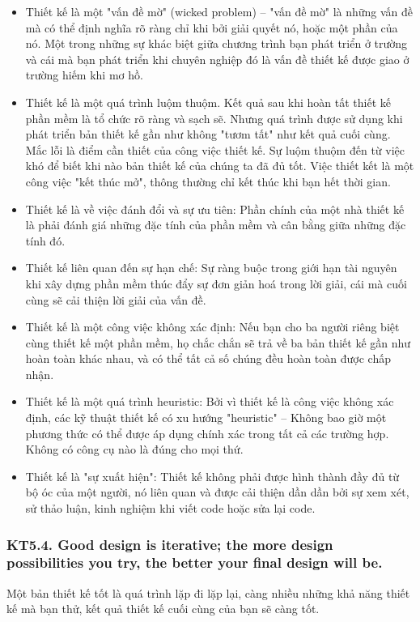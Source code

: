 \documentclass[12pt]{report}
\begin{document}
\begin{itemize}
	\item Thiết kế là một "vấn đề mờ" (wicked problem) -- "vấn đề mờ" là những vấn đề mà có thể định nghĩa rõ ràng chỉ khi bởi giải quyết nó, hoặc một phần của nó. Một trong những sự khác biệt giữa chương trình bạn phát triển ở trường và cái mà bạn phát triển khi chuyên nghiệp đó là vấn đề thiết kế được giao ở trường hiếm khi mơ hồ. 
	\item Thiết kế là một quá trình luộm thuộm. Kết quả sau khi hoàn tất thiết kế phần mềm là tổ chức rõ ràng và sạch sẽ. Nhưng quá trình được sử dụng khi phát triển bản thiết kế gần như không "tươm tất" như kết quả cuối cùng. Mắc lỗi là điểm cần thiết của công việc thiết kế. Sự luộm thuộm đến từ việc khó để biết khi nào bản thiết kế của chúng ta đã đủ tốt. Việc thiết kết là một công việc "kết thúc mở", thông thường chỉ kết thúc khi bạn hết thời gian. 
	\item Thiết kế là về việc đánh đổi và sự ưu tiên: Phần chính của một nhà thiết kế là phải đánh giá những đặc tính của phần mềm và cân bằng giữa những đặc tính đó. 
	\item Thiết kế liên quan đến sự hạn chế: Sự ràng buộc trong giới hạn tài nguyên khi xây dựng phần mềm thúc đẩy sự đơn giản hoá trong lời giải, cái mà cuối cùng sẽ cải thiện lời giải của vấn đề. 
	\item Thiết kế là một công việc không xác định: Nếu bạn cho ba người riêng biệt cùng thiết kế một phần mềm, họ chắc chắn sẽ trả về ba bản thiết kế gần như hoàn toàn khác nhau, và có thể tất cả số chúng đều hoàn toàn được chấp nhận. 
	\item Thiết kế là một quá trình heuristic: Bởi vì thiết kế là công việc không xác định, các kỹ thuật thiết kế có xu hướng "heuristic" -- Không bao giờ một phương thức có thể được áp dụng chính xác trong tất cả các trường hợp. Không có công cụ nào là đúng cho mọi thứ. 
	\item Thiết kế là "sự xuất hiện": Thiết kế không phải được hình thành đầy đủ từ bộ óc của một người, nó liên quan và được cải thiện dần dần bởi sự xem xét, sử thảo luận, kinh nghiệm khi viết code hoặc sửa lại code.   
\end{itemize}



\subsubsection{KT5.4. Good design is iterative; the more design possibilities you try, the better your final design will be.}
Một bản thiết kế tốt là quá trình lặp đi lặp lại, càng nhiều những khả năng thiết kế mà bạn thử, kết quả thiết kế cuối cùng của bạn sẽ càng tốt.
\vspace*{3mm}
\end{document}
